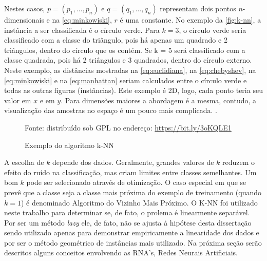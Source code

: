 Nestes casos, $ p = (p_1, \dots, p_n)$ e $ q = (q_1, \dots, q_n) $ representam dois pontos $n$-dimensionais e na \autoref{eq:minkowiski}, $r$ é uma constante. No exemplo da \autoref{fig:k-nn},  a instância a ser classificada é o círculo verde. Para $k = 3$, o círculo verde seria classificado com a classe do triângulo, pois há apenas um quadrado e 2 triângulos, dentro do círculo que os contém. Se k = 5 será classificado com a classe quadrada, pois há 2 triângulos e 3 quadrados, dentro do círculo externo. Neste exemplo, as distâncias mostradas na \autoref{eq:euclidiana}, na \autoref{eq:chebyshev}, na \autoref{eq:minkowiski} e na \autoref{eq:manhattan} seriam calculados entre o círculo verde e todas as outras figuras (instâncias). Este exemplo é 2D, logo, cada ponto teria seu valor em $x$ e em $y$. Para dimensões maiores a abordagem é a mesma, contudo, a visualização das amostras no espaço é um pouco mais complicada. \cite{Boscarioli2017} \cite{data_science_do_zero2016} \cite{goldschmidt2005}.

\begin{figure}[h!]
	\centering
	\caption{Exemplo do algoritmo k-NN}
	
	{\scriptsize Fonte: distribuído sob GPL no endereço: \href{https://bit.ly/3oKQLE1}{https://bit.ly/3oKQLE1} }
	\label{fig:k-nn}
\end{figure}

A escolha de $k$ depende dos dados. Geralmente, grandes valores de $k$ reduzem o efeito do ruído na classificação, mas criam limites entre classes semelhantes. Um bom $k$ pode ser selecionado através de otimização. O caso especial em que se prevê que a classe seja a classe mais próxima do exemplo de treinamento (quando  $k = 1$) é denominado Algoritmo do Vizinho Mais Próximo. O K-NN foi utilizado neste trabalho para determinar se, de fato, o prolema é linearmente separável. Por ser um método \textit{lazy} ele, de fato, não se ajusta à hipótese desta dissertação sendo utilizado apenas para demonstrar empiricamente a linearidade dos dados e por ser o método geométrico de instâncias mais utilizado. Na próxima seção serão descritos alguns conceitos envolvendo as RNA's, Redes Neurais Artificiais.

